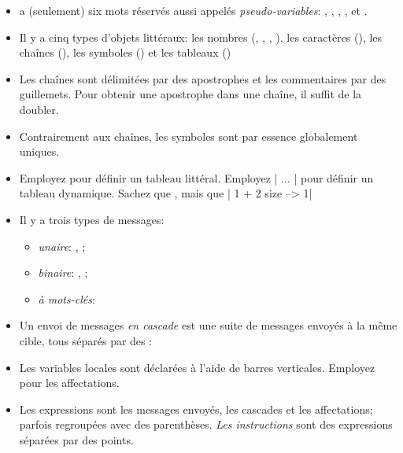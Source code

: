 \documentclass[a4paper,10pt,twoside]{book}
\begin{document}
\begin{itemize}

\item	\pharo a (seulement) six mots réservés aussi appelés
  \textit{pseudo-variables}: , , ,
  ,  et  .

\item	Il y a cinq types d'objets littéraux: les nombres (,
  , \mbox{,} ), les caractères
  (), %
les chaînes (), les symboles () et les tableaux ()

\item	Les chaînes sont délimitées par des apostrophes et les commentaires par des guillemets. Pour obtenir une apostrophe dans une chaîne, il suffit de la doubler.

\item	Contrairement aux chaînes, les symboles sont par essence globalement uniques.

\item	Employez  pour définir un tableau littéral.
		Employez \ct|{ ... }| pour définir un tableau dynamique.
		Sachez que
		, mais que 
		\ct|{ 1 + 2 } size --> 1|

\item	Il y a trois types de messages:
  \begin{itemize}
\item \emph{unaire}: \eg {}, ;
\item 		\emph{binaire}: \eg {}, ;
\item 		\emph{à mots-clés}: \eg {}%
      \end{itemize}
\item	Un envoi de messages \emph{en cascade}  est une suite de messages envoyés à la même cible, tous séparés par des \ct{;}:

\item	Les variables locales sont déclarées à l'aide de barres verticales.
        Employez \ct{:=} pour les affectations. 

\item	Les expressions sont les messages envoyés, les cascades et
  les affectations; parfois regroupées avec des parenthèses.
		\emph{Les instructions} sont des expressions séparées par des points.


\end{itemize}
\end{document}
